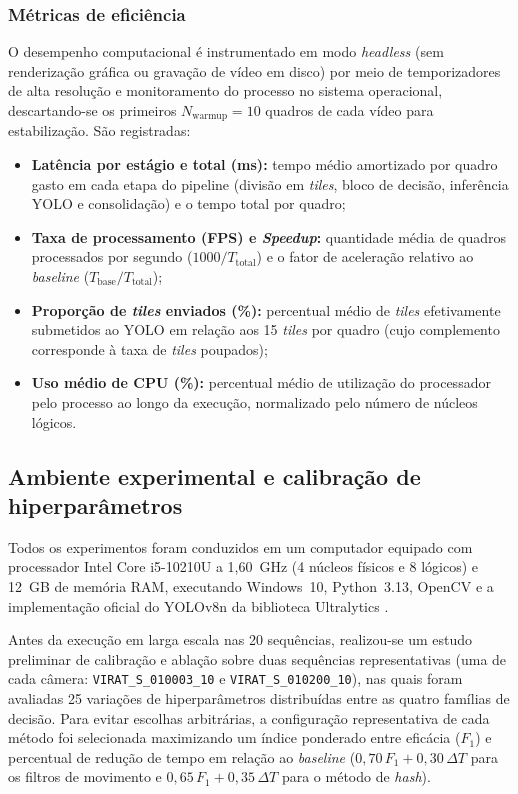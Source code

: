 \documentclass{ieeeaccess}
\begin{document}
\subsubsection{Métricas de eficiência}
O desempenho computacional é instrumentado em modo \textit{headless} (sem renderização gráfica ou gravação de vídeo em disco) por meio de temporizadores de alta resolução e monitoramento do processo no sistema operacional, descartando-se os primeiros $N_{\text{warmup}} = 10$ quadros de cada vídeo para estabilização. São registradas:
\begin{itemize}
    \item \textbf{Latência por estágio e total (ms):} tempo médio amortizado por quadro gasto em cada etapa do pipeline (divisão em \textit{tiles}, bloco de decisão, inferência YOLO e consolidação) e o tempo total por quadro;
    \item \textbf{Taxa de processamento (FPS) e \textit{Speedup}:} quantidade média de quadros processados por segundo ($1000 / T_{\text{total}}$) e o fator de aceleração relativo ao \textit{baseline} ($T_{\text{base}} / T_{\text{total}}$);
    \item \textbf{Proporção de \textit{tiles} enviados (\%):} percentual médio de \textit{tiles} efetivamente submetidos ao YOLO em relação aos 15 \textit{tiles} por quadro (cujo complemento corresponde à taxa de \textit{tiles} poupados);
    \item \textbf{Uso médio de CPU (\%):} percentual médio de utilização do processador pelo processo ao longo da execução, normalizado pelo número de núcleos lógicos.
\end{itemize}

\subsection{Ambiente experimental e calibração de hiperparâmetros}
\label{subsec:configuracao}

Todos os experimentos foram conduzidos em um computador equipado com processador Intel Core i5-10210U a 1,60~GHz (4 núcleos físicos e 8 lógicos) e 12~GB de memória RAM, executando Windows~10, Python~3.13, OpenCV \cite{opencv} e a implementação oficial do YOLOv8n da biblioteca Ultralytics \cite{ultralytics}.

Antes da execução em larga escala nas 20 sequências, realizou-se um estudo preliminar de calibração e ablação sobre duas sequências representativas (uma de cada câmera: \texttt{VIRAT\_S\_010003\_10} e \texttt{VIRAT\_S\_010200\_10}), nas quais foram avaliadas 25 variações de hiperparâmetros distribuídas entre as quatro famílias de decisão. Para evitar escolhas arbitrárias, a configuração representativa de cada método foi selecionada maximizando um índice ponderado entre eficácia ($F_1$) e percentual de redução de tempo em relação ao \textit{baseline} ($0{,}70\,F_1 + 0{,}30\,\Delta T$ para os filtros de movimento e $0{,}65\,F_1 + 0{,}35\,\Delta T$ para o método de \textit{hash}).
\end{document}
